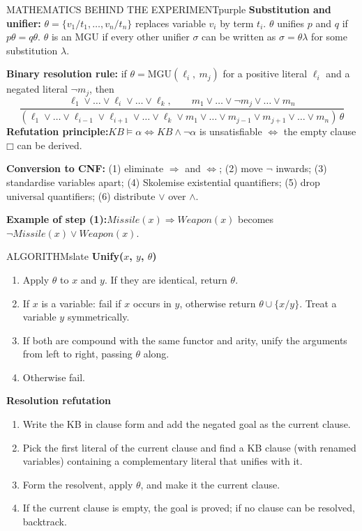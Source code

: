 \documentclass[11pt,a4paper]{article}
\providecommand{\square}{\mdlgwhtsquare}
\newenvironment{maths}{\begin{secbox}{MATHEMATICS BEHIND THE EXPERIMENT}{purple}}{\end{secbox}}
\newenvironment{algorithm}{\begin{secbox}{ALGORITHM}{slate}}{\end{secbox}}
\begin{document}
\begin{maths}
\textbf{Substitution and unifier:} $\theta=\{v_1/t_1,\dots,v_n/t_n\}$ replaces variable $v_i$ by term $t_i$. $\theta$ unifies $p$ and $q$ if $p\theta = q\theta$. $\theta$ is an MGU if every other unifier $\sigma$ can be written as $\sigma=\theta\lambda$ for some substitution $\lambda$.

\textbf{Binary resolution rule:} if $\theta=\mathrm{MGU}(\ell_i,\ m_j)$ for a positive literal $\ell_i$ and a negated literal $\lnot m_j$, then
\[ \frac{\ell_1\lor\dots\lor \ell_i \lor\dots\lor \ell_k,\qquad m_1\lor\dots\lor \lnot m_j\lor\dots\lor m_n}
{(\ell_1\lor\dots\lor \ell_{i-1}\lor \ell_{i+1}\lor\dots\lor \ell_k\lor m_1\lor\dots\lor m_{j-1}\lor m_{j+1}\lor\dots\lor m_n)\,\theta} \]
\textbf{Refutation principle:}\quad $KB \models \alpha \iff KB\land\lnot\alpha$ is unsatisfiable $\iff$ the empty clause $\square$ can be derived.

\textbf{Conversion to CNF:} (1) eliminate $\Rightarrow$ and $\Leftrightarrow$; (2) move $\lnot$ inwards; (3) standardise variables apart; (4) Skolemise existential quantifiers; (5) drop universal quantifiers; (6) distribute $\lor$ over $\land$.

\textbf{Example of step (1):}\quad $\mathit{Missile}(x)\Rightarrow \mathit{Weapon}(x)$ becomes $\lnot \mathit{Missile}(x)\lor \mathit{Weapon}(x)$.
\end{maths}

\begin{algorithm}
\textbf{Unify($x$, $y$, $\theta$)}
\begin{enumerate}
  \item Apply $\theta$ to $x$ and $y$. If they are identical, return $\theta$.
  \item If $x$ is a variable: fail if $x$ occurs in $y$, otherwise return $\theta\cup\{x/y\}$. Treat a variable $y$ symmetrically.
  \item If both are compound with the same functor and arity, unify the arguments from left to right, passing $\theta$ along.
  \item Otherwise fail.
\end{enumerate}
\textbf{Resolution refutation}
\begin{enumerate}
  \item Write the KB in clause form and add the negated goal as the current clause.
  \item Pick the first literal of the current clause and find a KB clause (with renamed variables) containing a complementary literal that unifies with it.
  \item Form the resolvent, apply $\theta$, and make it the current clause.
  \item If the current clause is empty, the goal is proved; if no clause can be resolved, backtrack.
\end{enumerate}
\end{algorithm}
\end{document}
